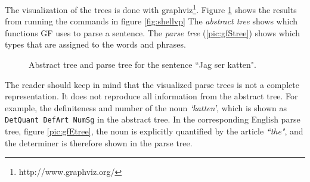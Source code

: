 \documentclass{report}
\begin{document}
The visualization of the trees is done with graphviz\footnote{http://www.graphviz.org/}.
Figure \ref{fig:gftree1} shows the results from running the commands in figure \ref{fig:shellvp}
The \textit{abstract tree} shows which functions GF uses
to parse a sentence.
The \textit{parse tree} (\ref{pic:gfStree}) shows which types
that are assigned to the words and phrases. 
\begin{figure}[h]
\centering
{}
\caption{Abstract tree and parse tree for the sentence ``Jag ser katten".}
\label{fig:gftree1}
\end{figure}
\vspace{10mm}
The reader should keep in mind that the visualized parse trees is not a
complete representation. It does not reproduce all information from the abstract tree.
For example, the definiteness and number of the noun \emph{`katten'}, which is shown as
\verb-DetQuant DefArt NumSg- in the abstract tree.
In the corresponding English parse tree, figure \ref{pic:gfEtree},
the noun is explicitly quantified by the article \emph{``the"},
and the determiner is therefore shown in the parse tree.\\
\end{document}
